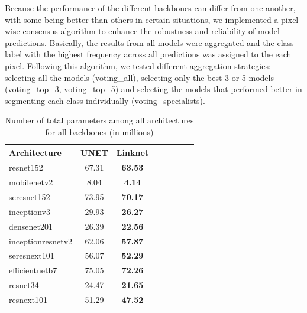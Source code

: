 Because the performance of the different backbones can differ from one
another, with some being better than others in certain situations, we
implemented a pixel-wise consensus algorithm to enhance the robustness and
reliability of model predictions. Basically, the results from all models were
aggregated and the class label with the highest frequency across all
predictions was assigned to the each pixel. Following this algorithm, we tested
different aggregation strategies: selecting all the models (voting\_all),
selecting only the best 3 or 5 models (voting\_top\_3, voting\_top\_5) and
selecting the models that performed better in segmenting each class
individually (voting\_specialists).

\begin{table}[H]
    \centering
    \caption[Number of parameters of each model]{Number of total parameters
        among all architectures for all
        backbones (in millions)}
    \label{tab:parameters-architectures}
    \begin{tabular}{lccccccc}
        \toprule
        \textbf{Architecture} & \textbf{UNET} & \textbf{Linknet} \\
        \midrule
        resnet152             & 67.31         & \textbf{63.53}   \\
        mobilenetv2           & 8.04          & \textbf{4.14}    \\
        seresnet152           & 73.95         & \textbf{70.17}   \\
        inceptionv3           & 29.93         & \textbf{26.27}   \\
        densenet201           & 26.39         & \textbf{22.56}   \\
        inceptionresnetv2     & 62.06         & \textbf{57.87}   \\
        seresnext101          & 56.07         & \textbf{52.29}   \\
        efficientnetb7        & 75.05         & \textbf{72.26}   \\
        resnet34              & 24.47         & \textbf{21.65}   \\
        resnext101            & 51.29         & \textbf{47.52}   \\
        \bottomrule
    \end{tabular}
\end{table}

